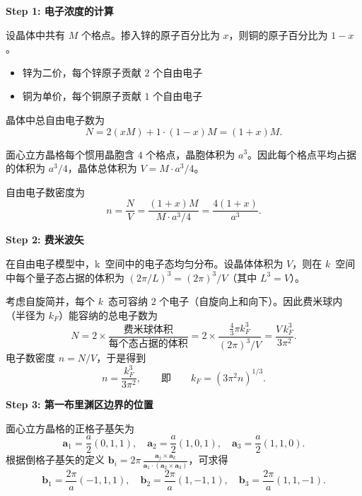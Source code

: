 \begin{derivationbox}[标准解题过程]
\textbf{Step 1: 电子浓度的计算}

设晶体中共有 $M$ 个格点。掺入锌的原子百分比为 $x$，则铜的原子百分比为 $1-x$。
\begin{itemize}
    \item 锌为二价，每个锌原子贡献 $2$ 个自由电子
    \item 铜为单价，每个铜原子贡献 $1$ 个自由电子
\end{itemize}
晶体中总自由电子数为
\begin{equation}
N = 2(xM) + 1\cdot(1-x)M = (1+x)M.
\end{equation}

面心立方晶格每个惯用晶胞含 $4$ 个格点，晶胞体积为 $a^{3}$。因此每个格点平均占据的体积为 $a^{3}/4$，晶体总体积为 $V=M\cdot a^{3}/4$。

自由电子数密度为
\begin{equation}
n = \frac{N}{V} = \frac{(1+x)M}{M\cdot a^{3}/4} = \frac{4(1+x)}{a^{3}}.
\label{eq:electron-density}
\end{equation}

\textbf{Step 2: 费米波矢}

在自由电子模型中，k~空间中的电子态均匀分布。设晶体体积为 $V$，则在 $k$~空间中每个量子态占据的体积为 $(2\pi/L)^3 = (2\pi)^3/V$（其中 $L^3=V$）。

考虑自旋简并，每个 $k$~态可容纳 $2$ 个电子（自旋向上和向下）。因此费米球内（半径为 $k_F$）能容纳的总电子数为
\begin{equation}
N = 2 \times \frac{\text{费米球体积}}{\text{每个态占据的体积}}
  = 2 \times \frac{\frac{4}{3}\pi k_F^{3}}{(2\pi)^3/V}
  = \frac{V\,k_F^{3}}{3\pi^{2}}.
\end{equation}
电子数密度 $n = N/V$，于是得到
\begin{equation}
n = \frac{k_F^{3}}{3\pi^{2}},
\qquad\text{即}\qquad
k_F = (3\pi^{2}n)^{1/3}.
\end{equation}

\textbf{Step 3: 第一布里渊区边界的位置}

面心立方晶格的正格子基矢为
\begin{equation}
\bm{a}_1 = \frac{a}{2}(0,1,1),\quad
\bm{a}_2 = \frac{a}{2}(1,0,1),\quad
\bm{a}_3 = \frac{a}{2}(1,1,0).
\end{equation}
根据倒格子基矢的定义 $\bm{b}_i = 2\pi\,\frac{\bm{a}_j\times\bm{a}_k}{\bm{a}_1\cdot(\bm{a}_2\times\bm{a}_3)}$，可求得
\begin{equation}
\bm{b}_1 = \frac{2\pi}{a}(-1,1,1),\quad
\bm{b}_2 = \frac{2\pi}{a}(1,-1,1),\quad
\bm{b}_3 = \frac{2\pi}{a}(1,1,-1).
\end{equation}


\end{derivationbox}
